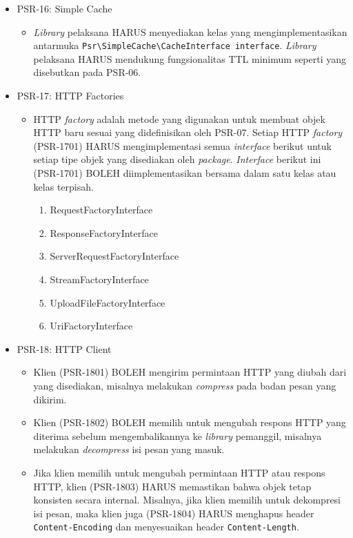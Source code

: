 \documentclass[a4paper,twoside]{article}
\begin{document}
\begin{enumerate}
\begin{enumerate}
\begin{itemize}
				\item PSR-16: Simple Cache
				\begin{itemize}
					\item \textit{Library} pelaksana HARUS menyediakan kelas yang mengimplementasikan antarmuka \verb|Psr\SimpleCache\CacheInterface interface|. \textit{Library} pelaksana HARUS mendukung fungsionalitas TTL minimum seperti yang disebutkan pada PSR-06.
					
				\end{itemize}
				
				\item PSR-17: HTTP Factories
				\begin{itemize}
					\item HTTP \textit{factory} adalah metode yang digunakan untuk membuat objek HTTP baru sesuai yang didefinisikan oleh PSR-07. Setiap HTTP \textit{factory} (PSR-1701) HARUS mengimplementasi semua \textit{interface} berikut untuk setiap tipe objek yang disediakan oleh \textit{package}. \textit{Interface} berikut ini (PSR-1701) BOLEH diimplementasikan bersama dalam satu kelas atau kelas terpisah.
					\begin{enumerate}
						\item RequestFactoryInterface
						\item ResponseFactoryInterface
						\item ServerRequestFactoryInterface
						\item StreamFactoryInterface
						\item UploadFileFactoryInterface
						\item UriFactoryInterface
					\end{enumerate} 
				\end{itemize}
				
				\item PSR-18: HTTP Client
				\begin{itemize}
					\item Klien (PSR-1801) BOLEH mengirim permintaan HTTP yang diubah dari yang disediakan, misalnya melakukan \textit{compress} pada badan pesan yang dikirim.
					\item Klien (PSR-1802) BOLEH memilih untuk mengubah respons HTTP yang diterima sebelum mengembalikannya ke \textit{library} pemanggil, misalnya melakukan \textit{decompress} isi pesan yang masuk. 
					\item Jika klien memilih untuk mengubah permintaan HTTP atau respons HTTP, klien (PSR-1803) HARUS memastikan bahwa objek tetap konsisten secara internal. Misalnya, jika klien memilih untuk dekompresi isi pesan, maka klien juga (PSR-1804) HARUS menghapus header \verb|Content-Encoding| dan menyesuaikan header \verb|Content-Length|.
					

\end{itemize}
\end{itemize}
\end{enumerate}
\end{enumerate}
\end{document}
